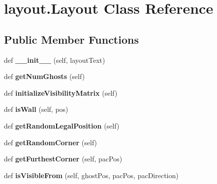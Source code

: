 \hypertarget{classlayout_1_1_layout}{}\section{layout.\+Layout Class Reference}
\label{classlayout_1_1_layout}
\subsection*{Public Member Functions}
\begin{DoxyCompactItemize}
\item 
\mbox{\label{classlayout_1_1_layout_a9315188e463c2a392e9ffbd56d4905cb}} 
def {\bfseries \+\_\+\+\_\+init\+\_\+\+\_\+} (self, layout\+Text)
\item 
\mbox{\label{classlayout_1_1_layout_adc4a2a5c6766df70656b82735233658b}} 
def {\bfseries get\+Num\+Ghosts} (self)
\item 
\mbox{\label{classlayout_1_1_layout_abe375dbaeb7a51ba9084a2f68be9e8a9}} 
def {\bfseries initialize\+Visibility\+Matrix} (self)
\item 
\mbox{\label{classlayout_1_1_layout_acfa1ebd690d85feca46f19b98bd0010d}} 
def {\bfseries is\+Wall} (self, pos)
\item 
\mbox{\label{classlayout_1_1_layout_a5e0682daef5027cb2a1de90ee55df82d}} 
def {\bfseries get\+Random\+Legal\+Position} (self)
\item 
\mbox{\label{classlayout_1_1_layout_a4508abb1e19f362186190d38d771b61b}} 
def {\bfseries get\+Random\+Corner} (self)
\item 
\mbox{\label{classlayout_1_1_layout_a74cb9bf2995079b0a014acb2e3621945}} 
def {\bfseries get\+Furthest\+Corner} (self, pac\+Pos)
\item 
\mbox{\label{classlayout_1_1_layout_a0cfafa0bf7e8db7dd59b5a887db260c5}} 
def {\bfseries is\+Visible\+From} (self, ghost\+Pos, pac\+Pos, pac\+Direction)
\item 
\mbox{\label{classlayout_1_1_layout_a9dc7c8d1acb6584c10a193d6369a31c4}} 

\end{DoxyCompactItemize}
